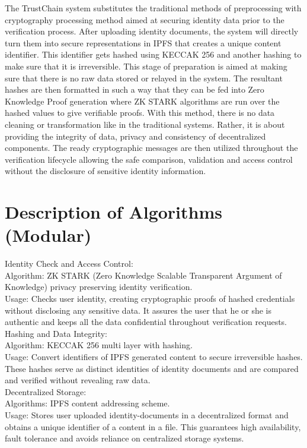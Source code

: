 The TrustChain system substitutes the traditional methods of preprocessing with cryptography processing method aimed at securing identity data prior to the verification process. After uploading identity documents, the system will directly turn them into secure representations in IPFS that creates a unique content identifier. This identifier gets hashed using KECCAK 256 and another hashing to make sure that it is irreversible. This stage of preparation is aimed at making sure that there is no raw data stored or relayed in the system. The resultant hashes are then formatted in such a way that they can be fed into Zero Knowledge Proof generation where ZK STARK algorithms are run over the hashed values to give verifiable proofs. With this method, there is no data cleaning or transformation like in the traditional systems. Rather, it is about providing the integrity of data, privacy and consistency of decentralized components. The ready cryptographic messages are then utilized throughout the verification lifecycle allowing the safe comparison, validation and access control without the disclosure of sensitive identity information.

\section{Description of Algorithms (Modular)}

Identity Check and Access Control:\\
Algorithm: ZK STARK (Zero Knowledge Scalable Transparent Argument of Knowledge) privacy preserving identity verification.\\
Usage: Checks user identity, creating cryptographic proofs of hashed credentials without disclosing any sensitive data. It assures the user that he or she is authentic and keeps all the data confidential throughout verification requests.\\

Hashing and Data Integrity:\\
Algorithm: KECCAK 256 multi layer with hashing.\\
Usage: Convert identifiers of IPFS generated content to secure irreversible hashes. These hashes serve as distinct identities of identity documents and are compared and verified without revealing raw data.\\

Decentralized Storage:\\
Algorithms: IPFS content addressing scheme.\\
Usage: Stores user uploaded identity-documents in a decentralized format and obtains a unique identifier of a content in a file. This guarantees high availability, fault tolerance and avoids reliance on centralized storage systems.\\

